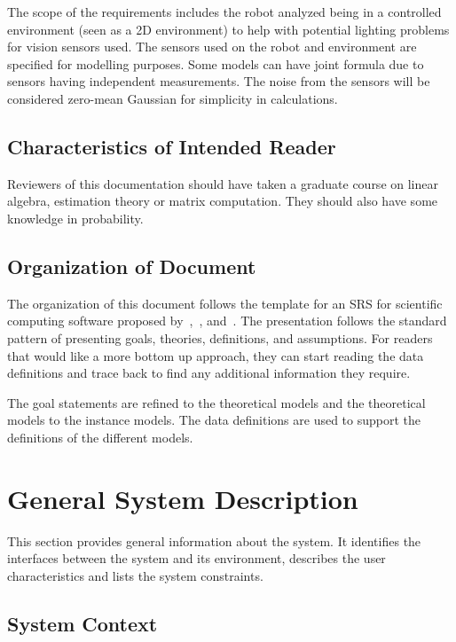 \documentclass[12pt]{article}
\begin{document}
The scope of the requirements includes the robot analyzed being in a controlled environment (seen as a 2D environment) to help with potential lighting problems for vision sensors used. The sensors used on the robot and environment are specified for modelling purposes. Some models can have joint formula due to sensors having independent measurements. The noise from the sensors will be considered zero-mean Gaussian for simplicity in calculations.

\subsection{Characteristics of Intended Reader}\label{sec_IntendedReader}

Reviewers of this documentation should have taken a graduate course on linear algebra, estimation theory or matrix computation. They should also have some knowledge in probability.

\subsection{Organization of Document}

The organization of this document follows the template for an SRS for scientific computing software proposed by~\cite{SmithAndLai2005},~\cite{SmithEtAl2007}, and~\cite{SmithAndKoothoor2016}. The presentation follows the standard pattern of presenting goals, theories, definitions, and assumptions. For readers that would like a more bottom up approach, they can start reading the data definitions and trace back to find any additional information they require.

The goal statements are refined to the theoretical models and the theoretical models to the instance models. The data definitions are used to support the definitions of the different models. 

\section{General System Description}

This section provides general information about the system.  It identifies the
interfaces between the system and its environment, describes the user
characteristics and lists the system constraints.

\subsection{System Context}
\end{document}
